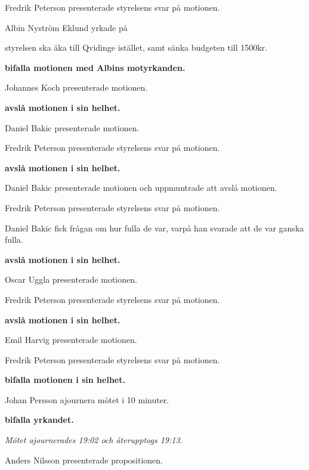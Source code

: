 \documentclass[10pt]{article}
\begin{document}
\begin{paragrafer}
\begin{paragrafer}
        Fredrik Peterson presenterade styrelsens svar på motionen.

        Albin Nyström Eklund yrkade på
        \begin{attsatser}
            \att styrelsen ska åka till Qvidinge istället, samt
            \att sänka budgeten till 1500kr.
        \end{attsatser}

        \textbf{\Mba bifalla motionen med Albins motyrkanden.}

        Johannes Koch presenterade motionen.

        \textbf{\Mba avslå motionen i sin helhet.}

        Daniel Bakic presenterade motionen.

        Fredrik Peterson presenterade styrelsens svar på motionen.

        \textbf{\Mba avslå motionen i sin helhet.}

        Daniel Bakic presenterade motionen och uppmuntrade att avslå motionen.

        Fredrik Peterson presenterade styrelsens svar på motionen.

        Daniel Bakic fick frågan om hur fulla de var, varpå han svarade att de var ganska fulla.

        \textbf{\Mba avslå motionen i sin helhet.}

        Oscar Uggla presenterade motionen.

        Fredrik Peterson presenterade styrelsens svar på motionen.

        \textbf{\Mba avslå motionen i sin helhet.}

        Emil Harvig presenterade motionen.

        Fredrik Peterson presenterade styrelsens svar på motionen.

        \textbf{\Mba bifalla motionen i sin helhet.}

        Johan Persson \ypa ajournera mötet i 10 minuter.

        \textbf{\Mba bifalla yrkandet.}

        \emph{Mötet ajournerades 19:02 och återupptogs 19:13.}

    \end{paragrafer}
    \begin{paragrafer}
        Anders Nilsson presenterade propositionen.


\end{paragrafer}
\end{paragrafer}
\end{document}
